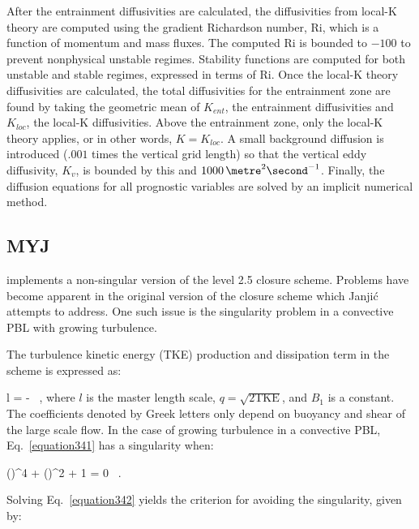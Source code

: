 After the entrainment diffusivities are calculated, the diffusivities from local-K theory are computed using the gradient Richardson number, $\mathrm{Ri}$, which is a function of momentum and mass fluxes. The computed $\mathrm{Ri}$ is bounded to $-100$ to prevent nonphysical unstable regimes. Stability functions are computed for both unstable and stable regimes, expressed in terms of $\mathrm{Ri}$. Once the local-K theory diffusivities are calculated, the total diffusivities for the entrainment zone are found by taking the geometric mean of $K_{ent}$, the entrainment diffusivities and ${K_{loc}}$, the local-K diffusivities. Above the entrainment zone, only the local-K theory applies, or in other words, $K=K_{loc}$. A small background diffusion is introduced ($.001$ times the vertical grid length) so that the vertical eddy diffusivity, $K_v$, is bounded by this and $1000\, \metre^2 \second^{-1}$. Finally, the diffusion equations for all prognostic variables are solved by an implicit numerical method.

\subsection{MYJ}
\label{pbl-myj-362}

 \citet{Jan02} implements a non-singular version of the  \citet{MY82} level 2.5 closure scheme. Problems have become apparent in the original version of the closure scheme which Janji\'{c} attempts to address. One such issue is the singularity problem in a convective PBL with growing turbulence.

The turbulence kinetic energy (TKE) production and dissipation term in the  \citet{MY82} scheme is expressed as:

\bea
l =  -  \, , \label{equation341}
\eea
\noindent
 where $l$ is the master length scale, $q=\sqrt{2\mathrm{TKE}}$, and $B_1$ is a constant. The coefficients denoted by Greek letters only depend on buoyancy and shear of the large scale flow. In the case of growing turbulence in a convective PBL, Eq.~\eqref{equation341} has a singularity when:

\be
\gamma\left(\right)^4 + \delta\left(\right)^2 + 1 = 0 \, . \label{equation342}
\ee

Solving Eq.~\eqref{equation342} yields the criterion for avoiding the singularity, given by:

